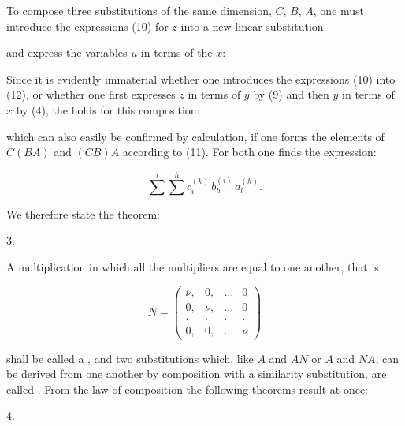 To compose three substitutions of the same dimension, $C$, $B$, $A$, one must introduce the expressions (10) for $z$ into a new linear substitution


and express the variables $u$ in terms of the $x$:


Since it is evidently immaterial whether one introduces the expressions (10) into (12), or whether one first expresses $z$ in terms of $y$ by (9) and then $y$ in terms of $x$ by (4), the  holds for this composition:


which can also easily be confirmed by calculation, if one forms the elements of $C(BA)$ and $(CB)A$ according to (11). For both one finds the expression:

\[
\sum^i \sum^h c_i^{(k)}\, b_h^{(i)}\, a_l^{(h)}.
\]

We therefore state the theorem:

\par
3.\enspace{}

A multiplication in which all the multipliers are equal to one another, that is

\[
N = \begin{pmatrix} \nu, & 0, & \ldots & 0 \\ 0, & \nu, & \ldots & 0 \\ \cdot & \cdot & \cdot & \cdot \\ 0, & 0, & \ldots & \nu \end{pmatrix}
\]

shall be called a , and two substitutions which, like $A$ and $AN$ or $A$ and $NA$, can be derived from one another by composition with a similarity substitution, are called . From the law of composition the following theorems result at once:

\par
4.\enspace{}
